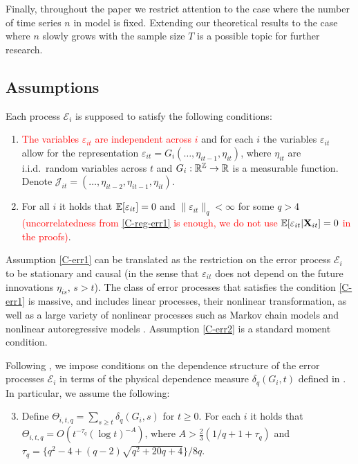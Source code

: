 \documentclass[a4paper,12pt]{article}
\makeatletter
\renewcommand{\eqref}[1]{\tagform@{\ref{#1}}}
\makeatother
\begin{document}
Finally, throughout the paper we restrict attention to the case where the number of time series $n$ in model \eqref{eq:model_full} is fixed. Extending our theoretical results to the case where $n$ slowly grows with the sample size $T$ is a possible topic for further research.

\subsection{Assumptions}\label{subsec:model_assumptions}

Each process $\mathcal{E}_i$ is supposed to satisfy the following conditions: 

\begin{enumerate}[label=(C\arabic*),leftmargin=1.05cm]

\item \label{C-err1} \textcolor{red}{The variables $\varepsilon_{it}$ are independent across $i$} and for each $i$ the variables $\varepsilon_{it}$ allow for the representation $\varepsilon_{it} = G_i(\ldots,\eta_{it-1},\eta_{it})$, where $\eta_{it}$ are i.i.d.\ random variables across $t$ and $G_i: \mathbb{R}^{\mathbb{Z}} \rightarrow \mathbb{R}$ is a measurable function. Denote \linebreak $\mathcal{J}_{it} = (\ldots,\eta_{it-2},\eta_{it-1},\eta_{it})$.

\item \label{C-err2} For all $i$ it holds that $\mathbb{E}[\varepsilon_{it}] =0$ and $\| \varepsilon_{it} \|_q < \infty$ for some $q > 4$ \textcolor{red}{(uncorrelatedness from \ref{C-reg-err1} is enough, we do not use $\mathbb{E}[\varepsilon_{it}| \mathbf{X}_{it}] = 0$ in the proofs)}.
\end{enumerate}
Assumption \ref{C-err1} can be translated as the restriction on the error process $\mathcal{E}_i$ to be stationary and causal (in the sense that $\varepsilon_{it}$ does not depend on the future innovations $\eta_{is},\, s >t$). The class of error processes that satisfies the condition \ref{C-err1} is massive, and includes linear processes, their nonlinear transformation, as well as a large variety of nonlinear processes such as Markov chain models and nonlinear autoregressive models \citep[][]{Wu2016}. Assumption \ref{C-err2} is a standard moment condition.

Following \cite{Wu2005}, we impose conditions on the dependence structure of the error processes $\mathcal{E}_i$ in terms of the physical dependence measure $\delta_q(G_i, t)$ defined in \eqref{eq:physical_dep}. In particular, we assume the following: 
\begin{enumerate}[label=(C\arabic*),leftmargin=1.05cm]
\setcounter{enumi}{2}

\item \label{C-err3} Define $\Theta_{i, t,q} = \sum\nolimits_{s \ge t} \delta_q(G_i, s)$ for $t \ge 0$. For each $i$ it holds that \linebreak
$\Theta_{i, t,q} = O ( t^{-\tau_q} (\log t)^{-A} )$,  
where $A > \frac{2}{3} (1/q + 1 + \tau_q)$ and \linebreak $\tau_q = \{q^2 - 4 + (q-2) \sqrt{q^2 + 20q + 4}\} / 8q$. 

\end{enumerate}
\end{document}
